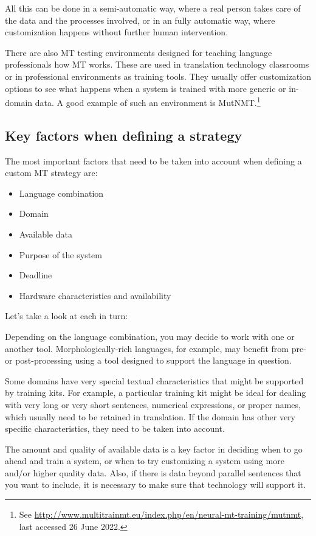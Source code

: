 \documentclass[output=paper]{langscibook}
\begin{document}
All this can be done in a semi-automatic way, where a real person takes care of the data and the processes involved, or in an fully automatic way, where  customization happens without further human intervention.

There are also MT testing environments designed for teaching language professionals how MT works. These are used in translation technology classrooms or in professional environments as training tools. They usually offer customization options to see what happens when a system is trained with more generic or in-domain data. A good example of such an environment is MutNMT.\footnote{See \url{http://www.multitrainmt.eu/index.php/en/neural-mt-training/mutnmt}, last accessed 26 June 2022.}

\subsection{Key factors when defining a strategy}

The most important factors that need to be taken into account when defining a custom MT strategy are:

\begin{itemize}
\item Language combination
\item Domain
\item Available data
\item Purpose of the system
\item Deadline
\item Hardware characteristics and availability
\end{itemize}

Let’s take a look at each in turn:

Depending on the language combination, you may decide to work with one or another tool. Morphologically-rich languages, for example, may benefit from pre- or post-processing using a tool designed to support the  language in question.  

Some domains have very special textual characteristics that might be supported by  training kits. For example, a particular training kit might be ideal for dealing with very long or very short sentences, numerical expressions, or proper names, which usually need to be retained in translation. If the domain has other very specific characteristics, they need to be taken into account. 

The amount and quality of available data is a key factor in deciding when to go ahead and train a system, or when to try customizing a system using more and/or higher quality data. Also, if there is data beyond parallel sentences that you want to include, it is necessary to make sure that technology will support it. 
\end{document}

